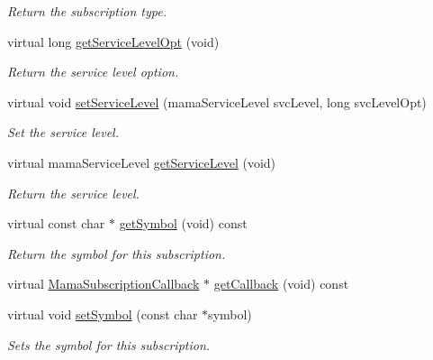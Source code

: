 \begin{DoxyCompactItemize}
\begin{DoxyCompactList}\small\item\em Return the subscription type. \item\end{DoxyCompactList}\item 
virtual long \hyperlink{classWombat_1_1MamaSubscription_a9766dd84a8b7a28b22ff1393954cf1d9}{getServiceLevelOpt} (void)
\begin{DoxyCompactList}\small\item\em Return the service level option. \item\end{DoxyCompactList}\item 
virtual void \hyperlink{classWombat_1_1MamaSubscription_a920036bab7805f4d13ea709343ae7260}{setServiceLevel} (mamaServiceLevel svcLevel, long svcLevelOpt)
\begin{DoxyCompactList}\small\item\em Set the service level. \item\end{DoxyCompactList}\item 
virtual mamaServiceLevel \hyperlink{classWombat_1_1MamaSubscription_abed527205b1f055af3e591cd43eb13f8}{getServiceLevel} (void)
\begin{DoxyCompactList}\small\item\em Return the service level. \item\end{DoxyCompactList}\item 
virtual const char $\ast$ \hyperlink{classWombat_1_1MamaSubscription_adaf58e3a3a3aa0b66f9af9bb28b22564}{getSymbol} (void) const 
\begin{DoxyCompactList}\small\item\em Return the symbol for this subscription. \item\end{DoxyCompactList}\item 
virtual \hyperlink{classWombat_1_1MamaSubscriptionCallback}{MamaSubscriptionCallback} $\ast$ \hyperlink{classWombat_1_1MamaSubscription_a32651a52180ffd292b27f2291559131a}{getCallback} (void) const 
\item 
virtual void \hyperlink{classWombat_1_1MamaSubscription_a189e15c14b75643e32e0e72b76d3bd14}{setSymbol} (const char $\ast$symbol)
\begin{DoxyCompactList}\small\item\em Sets the symbol for this subscription. \item\end{DoxyCompactList}\item 

\end{DoxyCompactItemize}
